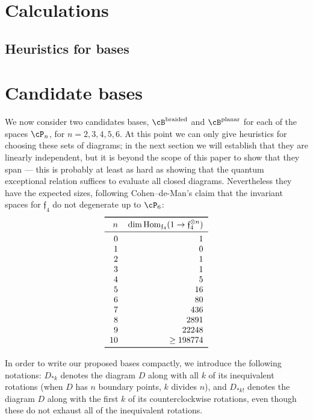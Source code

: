 \documentclass[12pt]{amsart}
\begin{document}
\section{Calculations}
\label{sec:calculations}
\newcommand{\V}{\mathcal{P}}

\subsection{Heuristics for bases}
\section{Candidate bases}
\label{sec:bases}
We now consider two candidates bases, $\cB^{\text{braided}}$ and $\cB^{\text
{planar}}$ for each of the spaces $\cP_n$, for $n = 2,3,4,5,6$.
At this point we can only give heuristics for choosing these sets of diagrams;
in the next section we will establish that they are linearly independent, but
it is beyond the scope of this paper to show that they span --- this is
probably at least as hard as showing that the quantum exceptional relation
suffices to evaluate all closed diagrams. Nevertheless they have the expected
sizes, following Cohen--de-Man's claim that the invariant spaces for
$\mathfrak{f}_4$ do not degenerate up to $\cP_6$:
\[
\begin{tabular}{rr}
  \toprule
  $n$ & $\dim \Hom_{\mathfrak{f}_4} (1 \to \mathfrak{f}_4^{\otimes n})$ \\
  \midrule
  0 & 1 \\ 1 & 0 \\ 2 & 1 \\ 3 & 1 \\ 4 & 5 \\ 5 & 16 \\
  6 & 80 \\ 7 & 436 \\ 8 & 2891 \\ 9 & 22248 \\ 10 & $\ge 198774$ \\
  \bottomrule
\end{tabular}
\]


\newcommand{\diagram}[2]{\mathfig{#1}{graphs/urn_sha1_#2.pdf}}

In order to write our proposed bases compactly, we introduce the following
notations: $D_{*k}$ denotes the diagram $D$ along with all $k$ of its
inequivalent rotations (when $D$ has $n$ boundary points, $k$ divides $n$),
and $D_{*k!}$ denotes the diagram $D$ along with the first $k$ of its
counterclockwise rotations, even though these do not exhaust all of the
inequivalent rotations.
\end{document}

